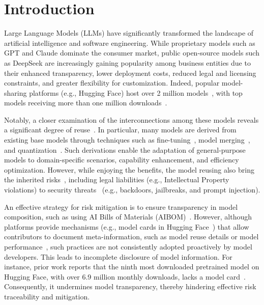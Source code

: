 \section{Introduction}


Large Language Models (LLMs) have significantly transformed the landscape of artificial intelligence and software engineering. While proprietary models such as GPT and Claude dominate the consumer market, public open-source models such as DeepSeek are increasingly gaining popularity among business entities due to their enhanced transparency, lower deployment costs, reduced legal and licensing constraints, and greater flexibility for customization. Indeed, popular model-sharing platforms (e.g., Hugging Face) host over 2 million models~\cite{hg}, with top models receiving more than one million downloads~\cite{Jiang2023AnES}.

Notably, a closer examination of the interconnections among these models reveals a significant degree of reuse~\cite{Jiang2023AnES}. In particular, many models are derived from existing base models through techniques such as fine-tuning~\cite{Fu2022OnTE}, model merging~\cite{Arora2024HeresAF}, and quantization~\cite{Yang2025ASO}. Such derivations enable the adaptation of general-purpose models to domain-specific scenarios, capability enhancement, and efficiency optimization. However, while enjoying the benefits, the model reusing also bring the inherited risks~\cite{chen2026empirical, wang2025large, hu2025large, egashira2025mind}, including legal liabilities (e.g., Intellectual Property violations) to security threats~\cite{jiang2023empirical, jia2022badencoder, greshake2023not} (e.g., backdoors, jailbreaks, and prompt injection).

An effective strategy for risk mitigation is to ensure transparency in model composition, such as using AI Bills of Materials (AIBOM)~\cite{aibom}. However, although platforms provide mechanisms (e.g., model cards in Hugging Face~\cite{hgmodelcard}) that allow contributors to document meta-information, such as model reuse details or model performance~\cite{Mitchell2018ModelCF}, such practices are not consistently adopted proactively by model developers. This leads to incomplete disclosure of model information. For instance, prior work reports that the ninth most downloaded pretrained model on Hugging Face, with over 6.9 million monthly downloads, lacks a model card~\cite{Jiang2023AnES}. Consequently, it undermines model transparency, thereby hindering effective risk traceability and mitigation. 

